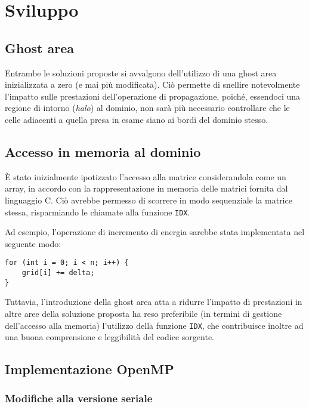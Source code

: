 \section{Sviluppo}

\subsection{Ghost area}

Entrambe le soluzioni proposte si avvalgono dell'utilizzo di una ghost area
inizializzata a zero (e mai più modificata).
Ciò permette di snellire notevolmente l'impatto sulle prestazioni
dell'operazione di propagazione, poiché, essendoci una regione di intorno
(\textit{halo}) al dominio, non sarà più necessario controllare che le celle
adiacenti a quella presa in esame siano ai bordi del dominio stesso.

\subsection{Accesso in memoria al dominio}

È stato inizialmente ipotizzato l'accesso alla matrice considerandola come un
array, in accordo con la rappresentazione in memoria delle matrici fornita dal
linguaggio C.
Ciò avrebbe permesso di scorrere in modo sequenziale la matrice stessa,
risparmiando le chiamate alla funzione \texttt{IDX}.

Ad esempio, l'operazione di incremento di energia sarebbe stata implementata nel
seguente modo:
\begin{verbatim}
for (int i = 0; i < n; i++) {
    grid[i] += delta;
}
\end{verbatim}

Tuttavia, l'introduzione della ghost area atta a ridurre l'impatto di
prestazioni in altre aree della soluzione proposta ha reso preferibile (in
termini di gestione dell'accesso alla memoria) l'utilizzo della funzione
\texttt{IDX}, che contribuisce inoltre ad una buona comprensione e leggibilità
del codice sorgente.

\subsection{Implementazione OpenMP}

\subsubsection{Modifiche alla versione seriale}

